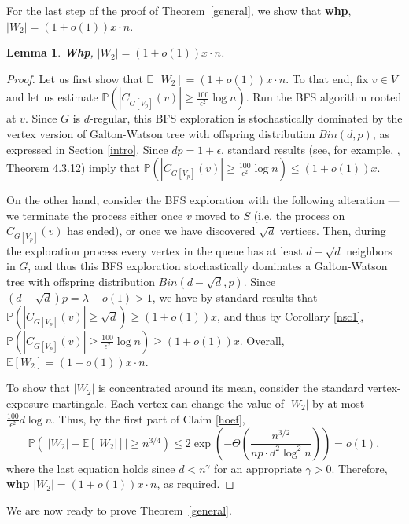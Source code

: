 \documentclass[notitlepage]{scrartcl}
\newtheorem{lemma}[thm]{Lemma}
\begin{document}
For the last step of the proof of Theorem~\ref{general}, we show that \textbf{whp}, $|W_2|=(1+o(1))x\cdot n$.

\begin{lemma} \label{large_comp_2}
    \textbf{Whp}, $|W_2|=(1+o(1))x\cdot n$.
\end{lemma}

\begin{proof}
    Let us first show that $\mathbb{E}[W_2] = (1 + o(1))x\cdot n$. To that end, fix $v \in V$ and let us estimate $\mathbb{P}\left(|C_{G[V_p]}(v)|\ge \frac{100}{\epsilon^2}\log n\right)$. Run the BFS algorithm rooted at $v$. Since $G$ is $d$-regular, this BFS exploration is stochastically dominated by the vertex version of Galton-Watson tree with offspring distribution $Bin(d,p)$, as expressed in Section \ref{intro}. Since $dp = 1+\epsilon$, standard results (see, for example, \cite{zbMATH06976511}, Theorem 4.3.12) imply that $\mathbb{P}\left(|C_{G[V_p]}(v)|\ge \frac{100}{\epsilon^2}\log n\right)\le (1+o(1))x$.

    On the other hand, consider the BFS exploration with the following alteration --- we terminate the process either once $v$ moved to $S$ (i.e, the process on $C_{G[V_p]}(v)$ has ended), or once we have discovered $\sqrt{d}$ vertices. Then, during the exploration process every vertex in the queue has at least $d-\sqrt{d}$ neighbors in $G$, and thus this BFS exploration stochastically dominates a Galton-Watson tree with offspring distribution $Bin\left(d-\sqrt{d},p\right)$. Since $\left(d -\sqrt{d}\right)p = \lambda - o(1)>1$, we have by standard results that $\mathbb{P}\left(|C_{G[V_p]}(v)|\ge \sqrt{d}\right)\ge (1+o(1))x$, and thus by Corollary \ref{nsc1}, $\mathbb{P}\left(|C_{G[V_p]}(v)|\ge \frac{100}{\epsilon^2}\log n\right)\ge (1+o(1))x$. Overall, $\mathbb{E}[W_2] = (1+o(1))x\cdot n$.
 
    To show that $|W_2|$ is concentrated around its mean, consider the standard vertex-exposure martingale. Each vertex can change the value of $|W_2|$ by at most $\frac{100}{\epsilon^2}d\log n$. Thus, by the first part of Claim \ref{hoef},
    $$\mathbb{P}\left(\big||W_2|-\mathbb{E}[|W_2|]\big|\geq n^{3/4}\right)\leq 2\exp \left(-\Theta\left(\frac{n^{3/2}}{np\cdot d^2\log^2 n}\right)\right)=o(1),$$
    where the last equation holds since $d<n^{\gamma}$ for an appropriate $\gamma>0$. Therefore, \textbf{whp} $|W_2| = (1 + o(1))x\cdot n$, as required.
\end{proof}

We are now ready to prove Theorem~\ref{general}.
\end{document}
